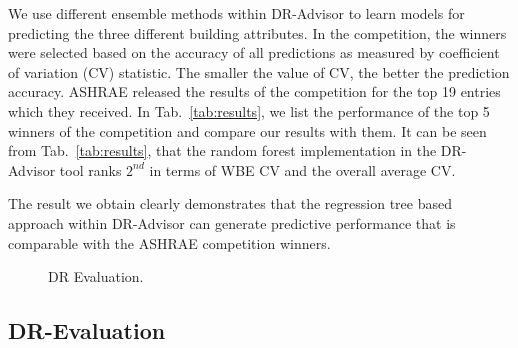 We use different ensemble methods within DR-Advisor to learn models for predicting the three different building attributes. 
In the competition, the winners were selected based on the accuracy of all predictions as measured by coefficient of variation (CV) statistic. 
The smaller the value of CV, the better the prediction accuracy.
ASHRAE released the results of the competition for the top 19 entries which they received. 
In Tab.~\ref{tab:results}, we list the performance of the top 5 winners of the competition and compare our results with them.
It can be seen from Tab.~\ref{tab:results}, that the random forest implementation in the DR-Advisor tool ranks $2^{nd}$ in terms of WBE CV and the overall average CV. 

The result we obtain clearly demonstrates that the regression tree based approach within DR-Advisor can generate predictive performance that is comparable with the ASHRAE competition winners. 

\begin{figure}
\caption{DR Evaluation.}
\end{figure}

\subsection{DR-Evaluation}
\label{sec:case_eval}

